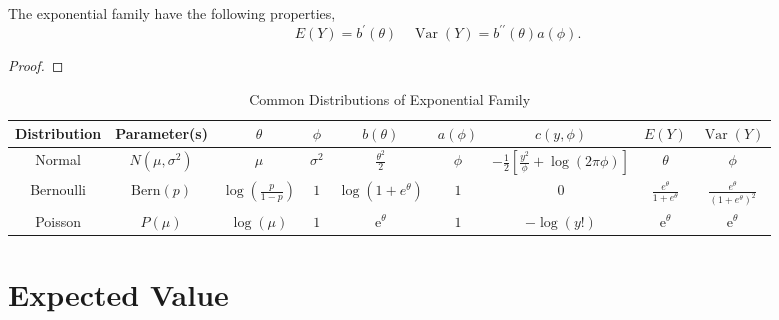 \begin{property}
    The exponential family have the following properties,
    \begin{equation*}
        E(Y)=b^{\prime}(\theta)\quad\operatorname{Var}(Y)=b^{\prime\prime}(\theta)a(\phi).
    \end{equation*}
\end{property}

\begin{proof}

\end{proof}

\begin{landscape}
    \begin{table}[hpt]
        \centering
        \caption{Common Distributions of Exponential Family}
        \begin{tabular}{ccccccccc}
            \toprule
            Distribution & Parameter(s)      & $\theta$                         & $\phi$       & $b(\theta)$                     & $a(\phi)$ & $c(y,\phi)$                                                   & $E(Y)$                            & $\operatorname{Var}(Y)$                            \\
            \midrule
            Normal       & $N(\mu,\sigma^2)$ & $\mu$                            & $\sigma^{2}$ & $\frac{\theta^{2}}{2}$          & $\phi$    & $-\frac{1}{2}\left[\frac{y^{2}}{\phi}+\log (2\pi\phi)\right]$ & $\theta$                          & $\phi$                                             \\
            Bernoulli    & $\text{Bern}(p)$  & $\log\left(\frac{p}{1-p}\right)$ & $1$          & $\log\left(1+e^{\theta}\right)$ & $1$       & $0$                                                           & $\frac{e^{\theta}}{1+e^{\theta}}$ & $\frac{e^{\theta}}{\left(1+e^{\theta}\right)^{2}}$ \\
            Poisson      & $P(\mu)$          & $\log(\mu)$                      & $1$          & $\mathrm{e}^{\theta}$           & $1$       & $-\log(y!)$                                                   & $\mathrm{e}^{\theta}$             & $\mathrm{e}^{\theta}$                              \\
            \bottomrule
        \end{tabular}
    \end{table}
\end{landscape}

\section{Expected Value}

